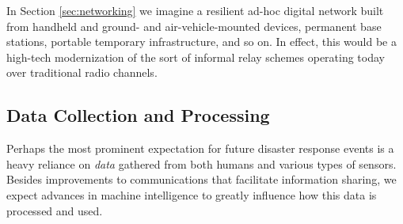 \documentclass[]             %
{NASA}                       %
\theoremstyle{definition}
\begin{document}
In Section \ref{sec:networking} we imagine a resilient ad-hoc digital
network built from handheld and ground- and air-vehicle-mounted
devices, permanent base stations, portable temporary infrastructure,
and so on. In effect, this would be a high-tech modernization of the
sort of informal relay schemes operating today over traditional radio
channels.


\subsection{Data Collection and Processing}
\label{towards-the-future}

Perhaps the most prominent expectation for future disaster response
events is a heavy reliance on \emph{data} gathered from both humans and various types of sensors. Besides improvements to
communications that facilitate information sharing, we expect advances
in machine intelligence to greatly influence how this data is
processed and used.
\end{document}
